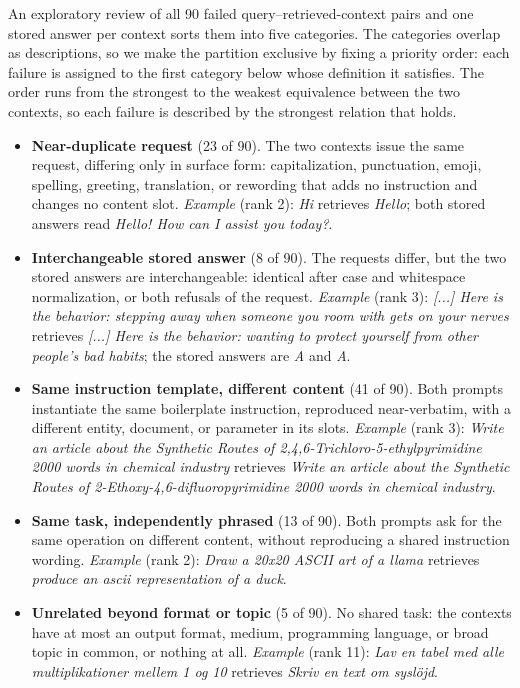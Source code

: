 
An exploratory review of all 90 failed query--retrieved-context pairs and one
stored answer per context sorts them into five categories. The categories
overlap as descriptions, so we make the partition exclusive by fixing a
priority order: each failure is assigned to the first category below whose
definition it satisfies. The order runs from the strongest to the weakest
equivalence between the two contexts, so each failure is described by the
strongest relation that holds.

\begingroup\sloppy
\begin{itemize}[leftmargin=1.2em,itemsep=2pt,topsep=2pt]
  \item \textbf{Near-duplicate request} (23 of 90). The two contexts issue the same request, differing only in surface form: capitalization, punctuation, emoji, spelling, greeting, translation, or rewording that adds no instruction and changes no content slot. \textit{Example} (rank 2): \emph{Hi} retrieves \emph{Hello}; both stored answers read \emph{Hello! How can I assist you today?}.
  \item \textbf{Interchangeable stored answer} (8 of 90). The requests differ, but the two stored answers are interchangeable: identical after case and whitespace normalization, or both refusals of the request. \textit{Example} (rank 3): \emph{[...] Here is the behavior: stepping away when someone you room with gets on your nerves} retrieves \emph{[...] Here is the behavior: wanting to protect yourself from other people's bad habits}; the stored answers are \emph{A} and \emph{A}.
  \item \textbf{Same instruction template, different content} (41 of 90). Both prompts instantiate the same boilerplate instruction, reproduced near-verbatim, with a different entity, document, or parameter in its slots. \textit{Example} (rank 3): \emph{Write an article about the Synthetic Routes of 2,4,6-Trichloro-5-ethylpyrimidine 2000 words in chemical industry} retrieves \emph{Write an article about the Synthetic Routes of 2-Ethoxy-4,6-difluoropyrimidine 2000 words in chemical industry}.
  \item \textbf{Same task, independently phrased} (13 of 90). Both prompts ask for the same operation on different content, without reproducing a shared instruction wording. \textit{Example} (rank 2): \emph{Draw a 20x20 ASCII art of a llama} retrieves \emph{produce an ascii representation of a duck}.
  \item \textbf{Unrelated beyond format or topic} (5 of 90). No shared task: the contexts have at most an output format, medium, programming language, or broad topic in common, or nothing at all. \textit{Example} (rank 11): \emph{Lav en tabel med alle multiplikationer mellem 1 og 10} retrieves \emph{Skriv en text om syslöjd}.
\end{itemize}
\endgroup

